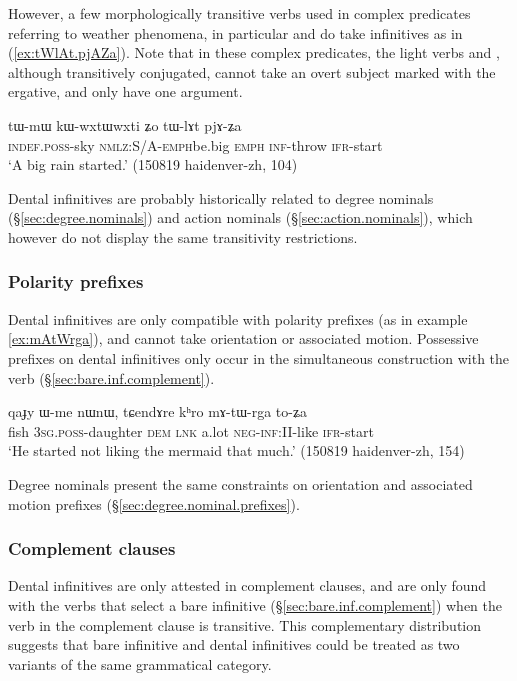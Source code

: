 However, a few morphologically transitive verbs used in complex predicates referring to weather phenomena, in particular  and  do take  infinitives as in (\ref{ex:tWlAt.pjAZa}).  Note that in these complex predicates, the light verbs  and , although transitively conjugated, cannot take an overt subject marked with the ergative, and only have one argument.
 
\begin{exe}
\ex  \label{ex:tWlAt.pjAZa}
\gll tɯ-mɯ kɯ-wxtɯ\redp{}wxti ʑo tɯ-lɤt pjɤ-ʑa \\
\textsc{indef.poss}-sky \textsc{nmlz:S/A-emph}\redp{}be.big \textsc{emph} \textsc{inf}-throw \textsc{ifr}-start \\
\glt `A big rain started.' (150819 haidenver-zh, 104)
\end{exe}

Dental infinitives are probably historically related to degree nominals (§\ref{sec:degree.nominals}) and action nominals (§\ref{sec:action.nominals}), which however do not display the same transitivity restrictions.

\subsubsection{Polarity prefixes} \label{sec:dental.inf.polarity}
Dental infinitives are only compatible with polarity prefixes (as in example \ref{ex:mAtWrga}), and cannot take orientation or associated motion. Possessive prefixes on dental infinitives only occur in the simultaneous construction with the verb  (§\ref{sec:bare.inf.complement}).

\begin{exe}
\ex  \label{ex:mAtWrga}
\gll qaɟy ɯ-me nɯnɯ, tɕendɤre kʰro mɤ-tɯ-rga to-ʑa\\
fish \textsc{3sg.poss}-daughter \textsc{dem} \textsc{lnk} a.lot \textsc{neg-inf:II}-like \textsc{ifr}-start \\
\glt `He started not liking the mermaid that much.' (150819 haidenver-zh, 154)
\end{exe}

Degree nominals present the same constraints on orientation and associated motion prefixes (§\ref{sec:degree.nominal.prefixes}).

\subsubsection{Complement clauses} \label{sec:dental.inf.complement}
Dental  infinitives are only attested in complement clauses, and are only found with the verbs that select a bare infinitive (§\ref{sec:bare.inf.complement}) when the verb in the complement clause is transitive. This complementary distribution suggests that bare infinitive and dental infinitives could be treated as two variants of the same grammatical category.


